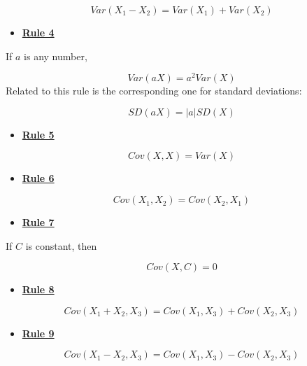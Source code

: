 \documentclass[
]{book}
\providecommand{\tightlist}{%
  \setlength{\itemsep}{0pt}\setlength{\parskip}{0pt}}
\begin{document}
\[
Var\left(X_{1} - X_{2}\right) =
Var\left(X_{1}\right) + Var\left(X_{2}\right)
\]

\begin{itemize}
\tightlist
\item
  \href{./variance.html\#Rule4}{\textbf{Rule 4}}
\end{itemize}

If \(a\) is any number,

\[
Var\left(aX\right) = a^2 Var\left(X\right)
\]
Related to this rule is the corresponding one for standard deviations:

\[
SD\left(aX\right) = \left| a \right| SD\left(X\right)
\]

\begin{itemize}
\tightlist
\item
  \href{./covariance.html\#Rule5}{\textbf{Rule 5}}
\end{itemize}

\[
Cov(X, X) = Var(X)
\]

\begin{itemize}
\tightlist
\item
  \href{./covariance.html\#Rule6}{\textbf{Rule 6}}
\end{itemize}

\[
Cov\left(X_{1}, X_{2}\right) = Cov\left(X_{2}, X_{1}\right)
\]

\begin{itemize}
\tightlist
\item
  \href{./covariance.html\#Rule7}{\textbf{Rule 7}}
\end{itemize}

If \(C\) is constant, then

\[
Cov\left(X, C\right) = 0
\]

\begin{itemize}
\tightlist
\item
  \href{./covariance.html\#Rule8}{\textbf{Rule 8}}
\end{itemize}

\[
Cov\left(X_{1} + X_{2}, X_{3}\right) = Cov\left(X_{1}, X_{3}\right) + Cov\left(X_{2}, X_{3}\right)  
\]

\begin{itemize}
\tightlist
\item
  \href{./covariance.html\#Rule9}{\textbf{Rule 9}}
\end{itemize}

\[
Cov\left(X_{1} - X_{2}, X_{3}\right) = Cov\left(X_{1}, X_{3}\right) - Cov\left(X_{2}, X_{3}\right)  
\]
\end{document}
